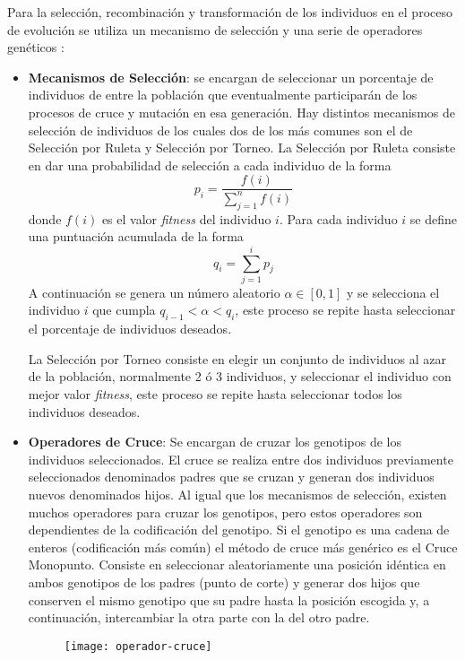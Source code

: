 Para la selección, recombinación y transformación de los individuos en el proceso de evolución se utiliza un mecanismo de selección y una serie de operadores genéticos \cite{cervigon09}:

\begin{itemize}
\item \textbf{Mecanismos de Selección}: se encargan  de seleccionar un porcentaje de individuos de entre la población que eventualmente participarán de los procesos de cruce y mutación en esa generación. Hay distintos mecanismos de selección de individuos de los cuales dos de los más comunes son el de Selección por Ruleta y Selección por Torneo. La Selección por Ruleta consiste en dar una probabilidad de selección a cada individuo de la forma
\begin{equation*}
p_i = \frac{f(i)}{\sum\limits_{j=1}^n f(i)}
\end{equation*}
donde $f(i)$ es el valor \textit{fitness} del individuo $i$. Para cada individuo $i$ se define una puntuación acumulada de la forma
\begin{equation*}
q_i = \sum\limits_{j=1}^i p_j
\end{equation*}
A continuación se genera un número aleatorio $\alpha \in [0,1]$ y se selecciona el individuo $i$ que cumpla $q_{i-1} < \alpha < q_i$, este proceso se repite hasta seleccionar el porcentaje de individuos deseados. 

La Selección por Torneo consiste en elegir un conjunto de individuos al azar de la población, normalmente 2 ó 3 individuos, y seleccionar el individuo con mejor valor \textit{fitness}, este proceso se repite hasta seleccionar todos los individuos deseados.

\item \textbf{Operadores de Cruce}: Se encargan de cruzar los genotipos de los individuos seleccionados. El cruce se realiza entre dos individuos previamente seleccionados denominados padres que se cruzan y generan dos individuos nuevos denominados hijos. Al igual que los mecanismos de selección, existen muchos operadores  para cruzar los genotipos, pero estos operadores son dependientes de la codificación del genotipo. Si el genotipo es una cadena de enteros (codificación más común) el método de cruce más genérico es el Cruce Monopunto. Consiste en seleccionar aleatoriamente una posición idéntica en ambos genotipos de los padres (punto de corte) y generar dos hijos que conserven el mismo genotipo que su padre hasta la posición escogida y, a continuación, intercambiar la otra parte con la del otro padre.
\begin{figure}[H]
\centering
\texttt{[image: operador-cruce]}
\end{figure}


\end{itemize}
